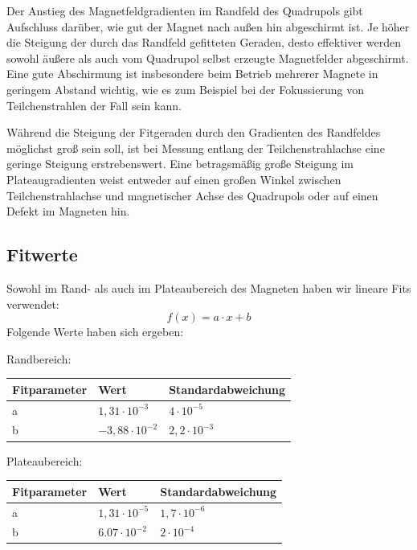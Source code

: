 \documentclass[bigchapter,colorback,accentcolor=tud4b,linedtoc,11pt]{tudreport}
\begin{document}
Der Anstieg des Magnetfeldgradienten im Randfeld des Quadrupols gibt Aufschluss darüber, wie gut der Magnet nach außen hin abgeschirmt ist. Je höher die Steigung der durch das Randfeld gefitteten Geraden, desto effektiver werden sowohl äußere als auch vom Quadrupol selbst erzeugte Magnetfelder abgeschirmt. Eine gute Abschirmung ist insbesondere beim Betrieb mehrerer Magnete in geringem Abstand wichtig, wie es zum Beispiel bei der Fokussierung von Teilchenstrahlen der Fall sein kann.



Während die Steigung der Fitgeraden durch den Gradienten des Randfeldes möglichst groß sein soll, ist bei Messung entlang der Teilchenstrahlachse eine geringe Steigung erstrebenswert. Eine betragsmäßig große Steigung im Plateaugradienten weist entweder auf einen großen Winkel zwischen Teilchenstrahlachse und magnetischer Achse des Quadrupols oder auf einen Defekt im Magneten hin.

\subsection{Fitwerte}
Sowohl im Rand- als auch im Plateaubereich des Magneten haben wir lineare Fits verwendet: 
$$f(x) = a \cdot x + b$$
Folgende Werte haben sich ergeben:

Randbereich:
\begin{center}
  \begin{tabular}{|p{2.6cm}|p{2.6cm}|p{3.5cm}|}
    \hline
    Fitparameter & Wert                   &  Standardabweichung \\ \hline
    a            & $1,31 \cdot 10^{-3}$   & $4 \cdot 10^{-5}$   \\ \hline
    b            & $-3,88 \cdot 10^{-2}$  & $2,2 \cdot 10^{-3}$ \\ \hline
	\end{tabular}
\end{center}


Plateaubereich:
\begin{center}
  \begin{tabular}{|p{2.6cm}|p{2.6cm}|p{3.5cm}|}
    \hline
    Fitparameter & Wert                  & Standardabweichung  \\ \hline
    a            & $1,31 \cdot 10^{-5}$  & $1,7 \cdot 10^{-6}$ \\ \hline
    b            & $6.07 \cdot 10^{-2}$  & $2 \cdot 10^{-4}$   \\ \hline
	\end{tabular}
\end{center}
\end{document}
